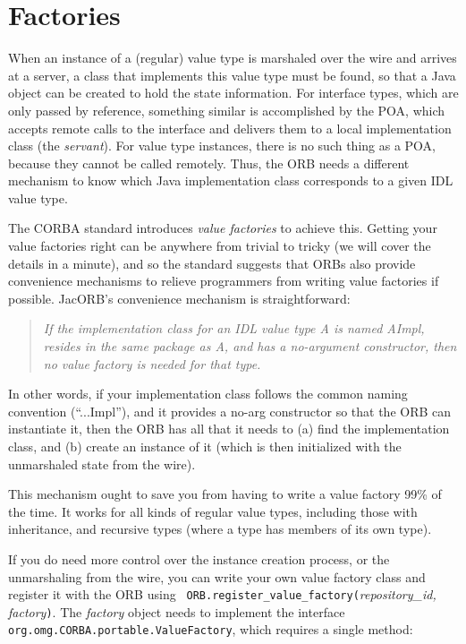 \section{Factories}

When an instance of a (regular) value type is marshaled over the wire
and arrives at a server, a class that implements this value type must
be found, so that a Java object can be created to hold the state
information.  For interface types, which are only passed by
reference, something similar is accomplished by the POA, which
accepts remote calls to the interface and delivers them to a local
implementation class (the \emph{servant}).  For value type instances,
there is no such thing as a POA, because they cannot be called
remotely.  Thus, the ORB needs a different mechanism to know which
Java implementation class corresponds to a given IDL value type.

The CORBA standard introduces \emph{value factories} to achieve this.
Getting your value factories right can be anywhere from trivial to
tricky (we will cover the details in a minute), and so the standard
suggests that ORBs also provide convenience mechanisms to relieve
programmers from writing value factories if possible.  JacORB's
convenience mechanism is straightforward:

\begin{quotation}
\noindent \emph{If the implementation class for an IDL value type A is named
  AImpl, resides in the same package as A, and has a no-argument
constructor, then no value factory is needed for that type.}
\end{quotation}

In other words, if your implementation class follows the common naming
convention (``...Impl''), and it provides a no-arg constructor
so that the ORB can instantiate it, then the ORB has all that it
needs to (a) find the implementation class, and (b) create an instance
of it (which is then initialized with the unmarshaled state from the
wire).

This mechanism ought to save you from having to write a value factory
99\% of the time.  It works for all kinds of regular value types,
including those with inheritance, and recursive types (where a type
has members of its own type).

If you do need more control over the instance creation process, or the
unmarshaling from the wire, you can write your own value factory
class and register it with the ORB using {\tt
ORB.register\_value\_factory(}\emph{repository\_id, factory}{\tt)}.
The \emph{factory} object needs to implement the interface {\tt
org.omg.CORBA.portable.ValueFactory}, which requires a single method:

